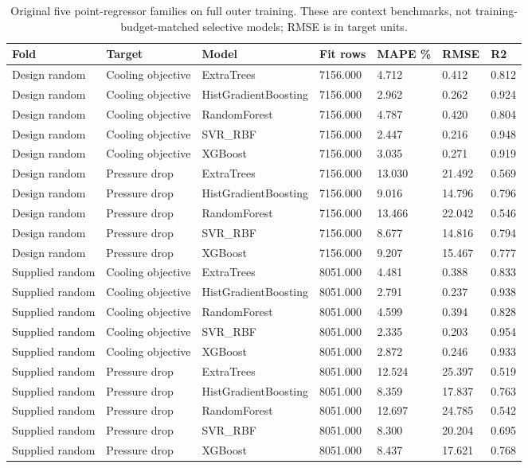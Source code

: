 \begin{table}[htbp]\centering\small\setlength{\tabcolsep}{3pt}\begin{tabular}{lllllll}
\toprule
Fold & Target & Model & Fit rows & MAPE \% & RMSE & R2\\\midrule
Design random & Cooling objective & ExtraTrees & 7156.000 & 4.712 & 0.412 & 0.812\\
Design random & Cooling objective & HistGradientBoosting & 7156.000 & 2.962 & 0.262 & 0.924\\
Design random & Cooling objective & RandomForest & 7156.000 & 4.787 & 0.420 & 0.804\\
Design random & Cooling objective & SVR\_RBF & 7156.000 & 2.447 & 0.216 & 0.948\\
Design random & Cooling objective & XGBoost & 7156.000 & 3.035 & 0.271 & 0.919\\
Design random & Pressure drop & ExtraTrees & 7156.000 & 13.030 & 21.492 & 0.569\\
Design random & Pressure drop & HistGradientBoosting & 7156.000 & 9.016 & 14.796 & 0.796\\
Design random & Pressure drop & RandomForest & 7156.000 & 13.466 & 22.042 & 0.546\\
Design random & Pressure drop & SVR\_RBF & 7156.000 & 8.677 & 14.816 & 0.794\\
Design random & Pressure drop & XGBoost & 7156.000 & 9.207 & 15.467 & 0.777\\
Supplied random & Cooling objective & ExtraTrees & 8051.000 & 4.481 & 0.388 & 0.833\\
Supplied random & Cooling objective & HistGradientBoosting & 8051.000 & 2.791 & 0.237 & 0.938\\
Supplied random & Cooling objective & RandomForest & 8051.000 & 4.599 & 0.394 & 0.828\\
Supplied random & Cooling objective & SVR\_RBF & 8051.000 & 2.335 & 0.203 & 0.954\\
Supplied random & Cooling objective & XGBoost & 8051.000 & 2.872 & 0.246 & 0.933\\
Supplied random & Pressure drop & ExtraTrees & 8051.000 & 12.524 & 25.397 & 0.519\\
Supplied random & Pressure drop & HistGradientBoosting & 8051.000 & 8.359 & 17.837 & 0.763\\
Supplied random & Pressure drop & RandomForest & 8051.000 & 12.697 & 24.785 & 0.542\\
Supplied random & Pressure drop & SVR\_RBF & 8051.000 & 8.300 & 20.204 & 0.695\\
Supplied random & Pressure drop & XGBoost & 8051.000 & 8.437 & 17.621 & 0.768\\
\bottomrule\end{tabular}\caption{Original five point-regressor families on full outer training. These are context benchmarks, not training-budget-matched selective models; RMSE is in target units.}\label{tab:ubend-point_baselines}\end{table}

